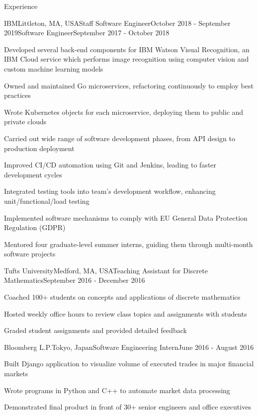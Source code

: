 \documentclass{resume}
\begin{document}
  \begin{rSection}{Experience}
    \begin{rSubsection}{IBM}{Littleton, MA, USA}{Staff Software Engineer}{October 2018 - September 2019}{Software Engineer}{September 2017 - October 2018}
    \item Developed several back-end components for IBM Watson Visual Recognition, an IBM Cloud service which performs image recognition using computer vision and custom machine learning models
    \item Owned and maintained Go microservices, refactoring continuously to employ best practices
    \item Wrote Kubernetes objects for each microservice, deploying them to public and private clouds
    \item Carried out wide range of software development phases, from API design to production deployment
    \item Improved CI/CD automation using Git and Jenkins, leading to faster development cycles
    \item Integrated testing tools into team's development workflow, enhancing unit/functional/load testing
    \item Implemented software mechanisms to comply with EU General Data Protection Regulation (GDPR)
    \item Mentored four graduate-level summer interns, guiding them through multi-month software projects
    \end{rSubsection}
    
    \begin{rSubsection}{Tufts University}{Medford, MA, USA}{Teaching Assistant for Discrete Mathematics}{September 2016 - December 2016}{}{}
    \item Coached 100+ students on concepts and applications of discrete mathematics
    \item Hosted weekly office hours to review class topics and assignments with students
    \item Graded student assignments and provided detailed feedback
    \end{rSubsection}
    
    \begin{rSubsection}{Bloomberg L.P.}{Tokyo, Japan}{Software Engineering Intern}{June 2016 - August 2016}{}{}
    \item Built Django application to visualize volume of executed trades in major financial markets
    \item Wrote programs in Python and C++ to automate market data processing
    \item Demonstrated final product in front of 30+ senior engineers and office executives
    \end{rSubsection}
  
  \end{rSection}
\end{document}
